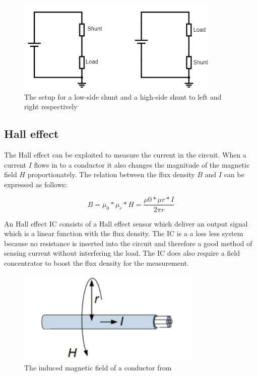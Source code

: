 \begin{figure}[h]
\centering
\includegraphics[height=4.5cm]{Project_Report/Images/shunt.PNG}
\caption{The setup for a low-side shunt and a high-side shunt to left and right respectively}
\label{fig:shunt}
\end{figure}







\subsection{Hall effect}
The Hall effect can be exploited to measure the current in the circuit. When a current $I$ flows in to a conductor it also changes the magnitude of the magnetic field $H$ proportionately. The relation between the flux density $B$ and $I$ can be expressed as follows:


\begin{equation}
B= \mu_{0}*\mu_{r}*H= \dfrac{\mu{0}*\mu{r}*I}{2\pi r}
\end{equation}

An Hall effect IC consists of a Hall effect sensor which deliver an output signal which is a linear function with the flux density. The IC is a a loss less system because no resistance is inserted into the circuit and therefore a good method of sensing current without interfering the load.  The IC does also require a field concentrator to boost the flux density for the measurement.
\begin{figure}[h]
\centering
\includegraphics[height=4.5cm]{Project_Report/Images/current.PNG}
\caption{The induced magnetic field of a conductor from \cite{Infineon}}
\label{fig:current}
\end{figure}



